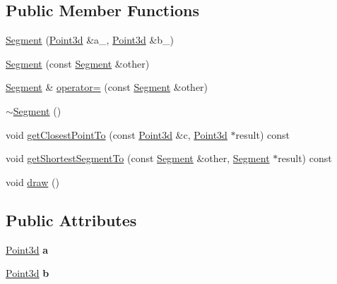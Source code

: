 \subsection*{Public Member Functions}
\begin{DoxyCompactItemize}
\item 
\hyperlink{classCartWheel_1_1Math_1_1Segment_aa08e590d8d326480b6f8f303215afdcd}{Segment} (\hyperlink{classCartWheel_1_1Math_1_1Point3d}{Point3d} \&a\_\-, \hyperlink{classCartWheel_1_1Math_1_1Point3d}{Point3d} \&b\_\-)
\item 
\hyperlink{classCartWheel_1_1Math_1_1Segment_a3b4b9d164de5fa476b607c7b49a71742}{Segment} (const \hyperlink{classCartWheel_1_1Math_1_1Segment}{Segment} \&other)
\item 
\hyperlink{classCartWheel_1_1Math_1_1Segment}{Segment} \& \hyperlink{classCartWheel_1_1Math_1_1Segment_ab43787f002b39c30c99310b1528a43d1}{operator=} (const \hyperlink{classCartWheel_1_1Math_1_1Segment}{Segment} \&other)
\item 
\hyperlink{classCartWheel_1_1Math_1_1Segment_a76b45a453304f1f485e3bc2fcad58b59}{$\sim$Segment} ()
\item 
void \hyperlink{classCartWheel_1_1Math_1_1Segment_a375a32c214713c92f1e1a30593080f46}{getClosestPointTo} (const \hyperlink{classCartWheel_1_1Math_1_1Point3d}{Point3d} \&c, \hyperlink{classCartWheel_1_1Math_1_1Point3d}{Point3d} $\ast$result) const 
\item 
void \hyperlink{classCartWheel_1_1Math_1_1Segment_a50ac8e268170b53058c103507481edd9}{getShortestSegmentTo} (const \hyperlink{classCartWheel_1_1Math_1_1Segment}{Segment} \&other, \hyperlink{classCartWheel_1_1Math_1_1Segment}{Segment} $\ast$result) const 
\item 
void \hyperlink{classCartWheel_1_1Math_1_1Segment_ace0de722d19d43f11e26cee59d7ca8e7}{draw} ()
\end{DoxyCompactItemize}
\subsection*{Public Attributes}
\begin{DoxyCompactItemize}
\item 
\hypertarget{classCartWheel_1_1Math_1_1Segment_a6dd4cba8b77c67a4e067173e610b0a63}{
\hyperlink{classCartWheel_1_1Math_1_1Point3d}{Point3d} {\bfseries a}}
\label{classCartWheel_1_1Math_1_1Segment_a6dd4cba8b77c67a4e067173e610b0a63}

\item 
\hypertarget{classCartWheel_1_1Math_1_1Segment_aafc0ea9bd213819ea79101ac86bc05a8}{
\hyperlink{classCartWheel_1_1Math_1_1Point3d}{Point3d} {\bfseries b}}
\label{classCartWheel_1_1Math_1_1Segment_aafc0ea9bd213819ea79101ac86bc05a8}

\end{DoxyCompactItemize}



